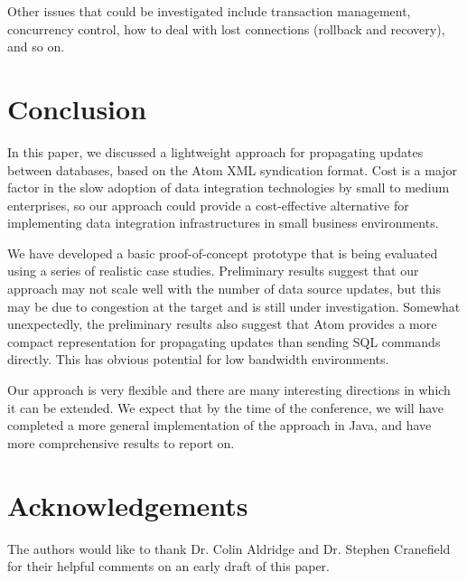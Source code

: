 \documentclass{CRPITStyle}
\begin{document}
Other issues that could be investigated include transaction management,
concurrency control, how to deal with lost connections (rollback and
recovery), and so on.


\section{Conclusion}
\label{sec-conclusion}

In this paper, we discussed a lightweight approach for propagating
updates between databases, based on the Atom XML syndication format.
Cost is a major factor in the slow adoption of data integration
technologies by small to medium enterprises, so our approach could
provide a cost-effective alternative for implementing data integration
infrastructures in small business environments.

We have developed a basic proof-of-concept prototype that is being
evaluated using a series of realistic case studies. Preliminary results
suggest that our approach may not scale well with the number of data
source updates, but this may be due to congestion at the target and is
still under investigation. Somewhat unexpectedly, the preliminary
results also suggest that Atom provides a more compact representation
for propagating updates than sending SQL commands directly. This has
obvious potential for low bandwidth environments.

Our approach is very flexible and there are many interesting directions
in which it can be extended. We expect that by the time of the
conference, we will have completed a more general implementation of the
approach in Java, and have more comprehensive results to report on.



\section*{Acknowledgements}
\label{sec-acknowledgements}

The authors would like to thank Dr. Colin Aldridge and Dr. Stephen
Cranefield for their helpful comments on an early draft of this paper.




\end{document}
